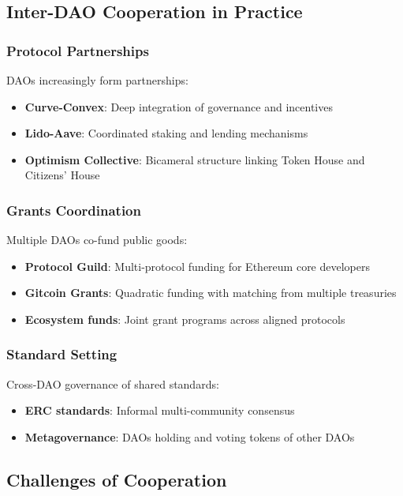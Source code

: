 
\subsection{Inter-DAO Cooperation in Practice}

\subsubsection{Protocol Partnerships}

DAOs increasingly form partnerships:
\begin{itemize}
    \item \textbf{Curve-Convex}: Deep integration of governance and incentives
    \item \textbf{Lido-Aave}: Coordinated staking and lending mechanisms
    \item \textbf{Optimism Collective}: Bicameral structure linking Token House and Citizens' House
\end{itemize}

\subsubsection{Grants Coordination}

Multiple DAOs co-fund public goods:
\begin{itemize}
    \item \textbf{Protocol Guild}: Multi-protocol funding for Ethereum core developers
    \item \textbf{Gitcoin Grants}: Quadratic funding with matching from multiple treasuries
    \item \textbf{Ecosystem funds}: Joint grant programs across aligned protocols
\end{itemize}

\subsubsection{Standard Setting}

Cross-DAO governance of shared standards:
\begin{itemize}
    \item \textbf{ERC standards}: Informal multi-community consensus
    \item \textbf{Metagovernance}: DAOs holding and voting tokens of other DAOs
\end{itemize}

\subsection{Challenges of Cooperation}

